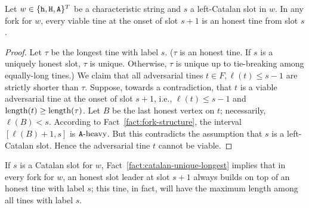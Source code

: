 \begin{fact}\label{fact:catalan-unique-longest}
  Let $w \in \{\mathtt{h}, \mathtt{H}, \mathtt{A}\}^T$ be a characteristic string 
  and $s$ a left-Catalan slot in $w$. 
  In any fork for $w$, 
  every viable tine at the onset of slot $s + 1$ is 
  an honest tine from slot $s$. 
\end{fact}
\begin{proof}
  Let $\tau$ be the longest tine with label $s$. 
  ($\tau$ is an honest tine. 
  If $s$ is a uniquely honest slot, 
  $\tau$ is unique. Otherwise, 
  $\tau$ is unique up to tie-breaking among equally-long tines.)
  We claim that 
  all adversarial tines $t \in F, \ell(t) \leq s - 1$ 
  are strictly shorter than $\tau$.
  Suppose, towards a contradiction, that 
  $t$ is a viable adversarial tine at the onset of slot $s + 1$, i.e., 
  $\ell(t) \leq s - 1$ and $\operatorname{length}(t) \geq \operatorname{length}(\tau)$. 
  Let $B$ be the last honest vertex on $t$; necessarily, $\ell(B) < s$. 
  According to 
  Fact~\ref{fact:fork-structure},
  the interval $[\ell(B) + 1, s]$ is $\mathtt{A}\text{-heavy}$. 
  But this contradicts the assumption that $s$ is a left-Catalan slot. 
  Hence the adversarial tine $t$ cannot be viable.
\end{proof}


\begin{observation}\label{obs:multi-honest}
  If $s$ is a Catalan slot for $w$, Fact~\ref{fact:catalan-unique-longest} implies that 
  in every fork for $w$, 
  an honest slot leader at slot $s + 1$ always 
  builds on top of an honest tine with label $s$; 
  this tine, in fact, will have the maximum length among all tines with label $s$.
\end{observation}



